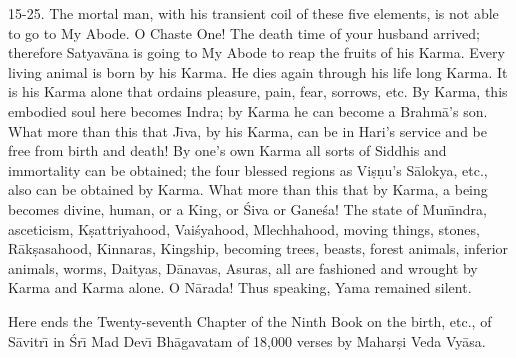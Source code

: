 15-25. The mortal man, with his transient coil of these five elements, is not able to go to My Abode. O Chaste One! The death time of your husband arrived; therefore Satyav\=ana is going to My Abode to reap the fruits of his Karma. Every living animal is born by his Karma. He dies again through his life long Karma. It is his Karma alone that ordains pleasure, pain, fear, sorrows, etc. By Karma, this embodied soul here becomes Indra; by Karma he can become a Brahm\=a's son. What more than this that J\={\i}va, by his Karma, can be in Hari's service and be free from birth and death! By one's own Karma all sorts of Siddhis and immortality can be obtained; the four blessed regions as Vi\d{s}\d{n}u's S\=alokya, etc., also can be obtained by Karma. What more than this that by Karma, a being becomes divine, human, or a King, or \'Siva or Gane\'sa! The state of Mun\={\i}ndra, asceticism, K\d{s}attriyahood, Vai\'syahood, Mlechhahood, moving things, stones, R\=ak\d{s}asahood, Kinnaras, Kingship, becoming trees, beasts, forest animals, inferior animals, worms, Daityas, D\=anavas, Asuras, all are fashioned and wrought by Karma and Karma alone. O N\=arada! Thus speaking, Yama remained silent.

Here ends the Twenty-seventh Chapter of the Ninth Book on the birth, etc., of S\=avitr\={\i} in \'Sr\={\i} Mad Dev\={\i} Bh\=agavatam of 18,000 verses by Mahar\d{s}i Veda Vy\=asa.



